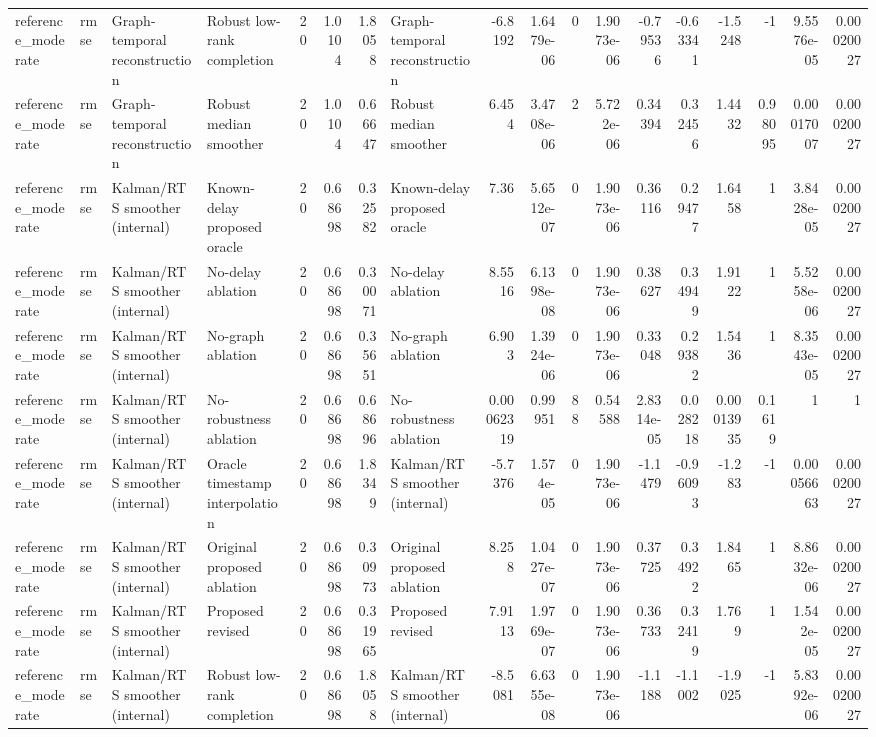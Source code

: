 \begin{table}[!htbp]
{\begin{tabular}{llllrrrlrrrrrrrrrr}
reference_moderate & rmse & Graph-temporal reconstruction & Robust low-rank completion & 20 & 1.0104 & 1.8058 & Graph-temporal reconstruction & -6.8192 & 1.6479e-06 & 0 & 1.9073e-06 & -0.79536 & -0.63341 & -1.5248 & -1 & 9.5576e-05 & 0.00020027 \\
reference_moderate & rmse & Graph-temporal reconstruction & Robust median smoother & 20 & 1.0104 & 0.66647 & Robust median smoother & 6.454 & 3.4708e-06 & 2 & 5.722e-06 & 0.34394 & 0.32456 & 1.4432 & 0.98095 & 0.00017007 & 0.00020027 \\
reference_moderate & rmse & Kalman/RTS smoother (internal) & Known-delay proposed oracle & 20 & 0.68698 & 0.32582 & Known-delay proposed oracle & 7.36 & 5.6512e-07 & 0 & 1.9073e-06 & 0.36116 & 0.29477 & 1.6458 & 1 & 3.8428e-05 & 0.00020027 \\
reference_moderate & rmse & Kalman/RTS smoother (internal) & No-delay ablation & 20 & 0.68698 & 0.30071 & No-delay ablation & 8.5516 & 6.1398e-08 & 0 & 1.9073e-06 & 0.38627 & 0.34949 & 1.9122 & 1 & 5.5258e-06 & 0.00020027 \\
reference_moderate & rmse & Kalman/RTS smoother (internal) & No-graph ablation & 20 & 0.68698 & 0.35651 & No-graph ablation & 6.903 & 1.3924e-06 & 0 & 1.9073e-06 & 0.33048 & 0.29382 & 1.5436 & 1 & 8.3543e-05 & 0.00020027 \\
reference_moderate & rmse & Kalman/RTS smoother (internal) & No-robustness ablation & 20 & 0.68698 & 0.68696 & No-robustness ablation & 0.00062319 & 0.99951 & 88 & 0.54588 & 2.8314e-05 & 0.028218 & 0.00013935 & 0.1619 & 1 & 1 \\
reference_moderate & rmse & Kalman/RTS smoother (internal) & Oracle timestamp interpolation & 20 & 0.68698 & 1.8349 & Kalman/RTS smoother (internal) & -5.7376 & 1.574e-05 & 0 & 1.9073e-06 & -1.1479 & -0.96093 & -1.283 & -1 & 0.00056663 & 0.00020027 \\
reference_moderate & rmse & Kalman/RTS smoother (internal) & Original proposed ablation & 20 & 0.68698 & 0.30973 & Original proposed ablation & 8.258 & 1.0427e-07 & 0 & 1.9073e-06 & 0.37725 & 0.34922 & 1.8465 & 1 & 8.8632e-06 & 0.00020027 \\
reference_moderate & rmse & Kalman/RTS smoother (internal) & Proposed revised & 20 & 0.68698 & 0.31965 & Proposed revised & 7.9113 & 1.9769e-07 & 0 & 1.9073e-06 & 0.36733 & 0.32419 & 1.769 & 1 & 1.542e-05 & 0.00020027 \\
reference_moderate & rmse & Kalman/RTS smoother (internal) & Robust low-rank completion & 20 & 0.68698 & 1.8058 & Kalman/RTS smoother (internal) & -8.5081 & 6.6355e-08 & 0 & 1.9073e-06 & -1.1188 & -1.1002 & -1.9025 & -1 & 5.8392e-06 & 0.00020027 \\

\end{tabular}}
\end{table}

